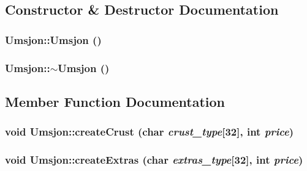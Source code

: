 \subsection{Constructor \& Destructor Documentation}
\hypertarget{class_umsjon_1f89bef332176cd139fa5f900d4735b6}{
\subsubsection[Umsjon]{\setlength{\rightskip}{0pt plus 5cm}Umsjon::Umsjon ()}}
\label{class_umsjon_1f89bef332176cd139fa5f900d4735b6}


\hypertarget{class_umsjon_0e6a6c83c46b16695a818c39dd4a700a}{
\subsubsection[$\sim$Umsjon]{\setlength{\rightskip}{0pt plus 5cm}Umsjon::$\sim$Umsjon ()}}
\label{class_umsjon_0e6a6c83c46b16695a818c39dd4a700a}




\subsection{Member Function Documentation}
\hypertarget{class_umsjon_75c9c243db5456ca368b8cdc6f617603}{
\subsubsection[createCrust]{\setlength{\rightskip}{0pt plus 5cm}void Umsjon::create\-Crust (char {\em crust\_\-type}\mbox{[}32\mbox{]}, int {\em price})}}
\label{class_umsjon_75c9c243db5456ca368b8cdc6f617603}


\hypertarget{class_umsjon_b3b4384d1b6159cee7aab19dc1ff23eb}{
\subsubsection[createExtras]{\setlength{\rightskip}{0pt plus 5cm}void Umsjon::create\-Extras (char {\em extras\_\-type}\mbox{[}32\mbox{]}, int {\em price})}}
\label{class_umsjon_b3b4384d1b6159cee7aab19dc1ff23eb}


